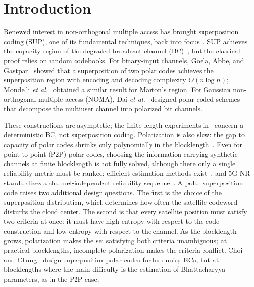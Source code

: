 \documentclass[conference]{IEEEtran}
\begin{document}
\section{Introduction}
Renewed interest in non-orthogonal multiple access has brought superposition coding (SUP), one of its fundamental techniques, back into focus~\cite{7676258,9154358}. SUP achieves the capacity region of the degraded broadcast channel (BC)~\cite{CoverBC,ElGamalKim:book}, but the classical proof relies on random codebooks. For binary-input channels, Goela, Abbe, and Gastpar~\cite{6975233} showed that a superposition of two polar codes achieves the superposition region with encoding and decoding complexity $O(n\log n)$; Mondelli \emph{et al.}~\cite{mondelli2015marton} obtained a similar result for Marton's region. For Gaussian non-orthogonal multiple access (NOMA), Dai \emph{et al.}~\cite{dai2018pcnoma} designed polar-coded schemes that decompose the multiuser channel into polarized bit channels.

These constructions are asymptotic; the finite-length experiments in~\cite{6975233} concern a deterministic BC, not superposition coding. Polarization is also slow: the gap to capacity of polar codes shrinks only polynomially in the blocklength~\cite{hassani2014scaling}. Even for point-to-point (P2P) polar codes, choosing the information-carrying synthetic channels at finite blocklength is not fully solved, although there only a single reliability metric must be ranked: efficient estimation methods exist~\cite{talvardy2013}, and 5G NR standardizes a channel-independent reliability sequence~\cite{3gpp38212,bioglio2021}. A polar superposition code raises two additional design questions. The first is the choice of the superposition distribution, which determines how often the satellite codeword disturbs the cloud center. The second is that every satellite position must satisfy two criteria at once: it must have high entropy with respect to the code construction and low entropy with respect to the channel. As the blocklength grows, polarization makes the set satisfying both criteria unambiguous; at practical blocklengths, incomplete polarization makes the criteria conflict. Choi and Chung~\cite{CHOI2017111} design superposition polar codes for less-noisy BCs, but at blocklengths where the main difficulty is the estimation of Bhattacharyya parameters, as in the P2P case.
\end{document}
